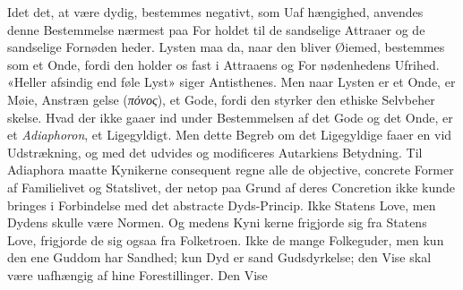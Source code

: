 \documentclass[12pt,a4paper]{book}
\newcommand{\gk}[1]{\textit{#1}}
\begin{document}
Idet det, at være dydig, bestemmes negativt, som Uaf\-%
hængighed, anvendes denne Bestemmelse nærmest paa For\-%
holdet til de sandselige Attraaer og de sandselige Fornøden\-%
heder. Lysten maa da, naar den bliver Øiemed, bestemmes
som et Onde, fordi den holder os fast i Attraaens og For\-%
nødenhedens Ufrihed. «Heller afsindig end føle Lyst» siger
Antisthenes. Men naar Lysten er et Onde, er Møie, Anstræn\-%
gelse (\gk{πόνος}), et Gode, fordi den styrker den ethiske Selvbeher\-%
skelse. Hvad der ikke gaaer ind under Bestemmelsen af det
Gode og det Onde, er et \emph{Adiaphoron}, et Ligegyldigt. Men
dette Begreb om det Ligegyldige faaer en vid Udstrækning,
og med det udvides og modificeres Autarkiens Betydning.
Til Adiaphora maatte Kynikerne consequent regne alle de
objective, concrete Former af Familielivet og Statslivet, der
netop paa Grund af deres Concretion ikke kunde bringes i
Forbindelse med det abstracte Dyds-Princip. Ikke Statens
Love, men Dydens skulle være Normen. Og medens Kyni\-%
kerne frigjorde sig fra Statens Love, frigjorde de sig ogsaa
fra Folketroen. Ikke de mange Folkeguder, men kun den ene
Guddom har Sandhed; kun Dyd er sand Gudsdyrkelse; den
Vise skal være uafhængig af hine Forestillinger. Den Vise
\end{document}
